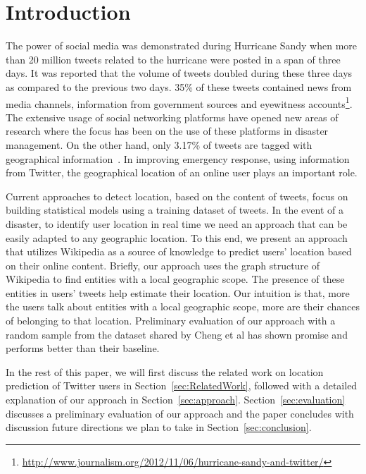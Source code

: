 \section{Introduction}
\label{sec:Introduction}

The power of social media was demonstrated during Hurricane Sandy when more than 20 million tweets related to the hurricane were posted in a span of three days. It was reported that the volume of tweets doubled during these three days as compared to the previous two days. 35\% of these tweets contained news from media channels, information from government sources and eyewitness accounts\footnote{\url{http://www.journalism.org/2012/11/06/hurricane-sandy-and-twitter/}}. The extensive usage of social networking platforms have opened new areas of research where the focus has been on the use of these platforms in disaster management. On the other hand, only  3.17\% of tweets are tagged with geographical information~\cite{morstatter2013sample}. In improving emergency response, using information from Twitter, the geographical location of an online user plays an important role. 

Current approaches to detect location, based on the content of tweets, focus on building statistical models using a training dataset of tweets.
In the event of a disaster, to identify user location in real time we need an approach that can be easily adapted to any geographic location. To this end, we present an approach that utilizes Wikipedia as a source of knowledge to predict users' location based on their online content. Briefly, our approach uses the graph structure of Wikipedia to find entities with a local geographic scope. The presence of these entities in users' tweets help estimate their location. Our intuition is that, more the users talk about entities with a local geographic scope, more are their chances of belonging to that location. Preliminary evaluation of our approach with a random sample from the dataset shared by Cheng et al\cite{cheng2010you} has shown promise and performs better than their baseline.   

In the rest of this paper, we will first discuss the related work on location prediction of Twitter users in Section~\ref{sec:RelatedWork}, followed with a detailed explanation of our approach in Section~\ref{sec:approach}. Section~\ref{sec:evaluation} discusses a preliminary evaluation of our approach and the paper concludes with discussion future directions we plan to take in Section~\ref{sec:conclusion}. 